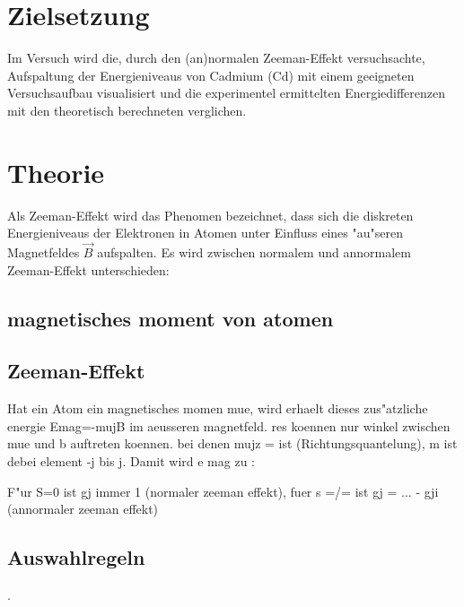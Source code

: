 \section{Zielsetzung}
  Im Versuch wird die, durch den (an)normalen Zeeman-Effekt versuchsachte, Aufspaltung der Energieniveaus von Cadmium (Cd) mit einem geeigneten Versuchsaufbau visualisiert und die experimentel ermittelten Energiedifferenzen mit den theoretisch berechneten verglichen.


\section{Theorie}
\label{sec:Theorie}
  Als Zeeman-Effekt wird das Phenomen bezeichnet, dass sich die diskreten Energieniveaus der Elektronen in Atomen unter Einfluss eines "au"seren Magnetfeldes $\vec{B}$ aufspalten.
  Es wird zwischen normalem und annormalem Zeeman-Effekt unterschieden:
  \subsection{magnetisches moment von atomen}


  \subsection{Zeeman-Effekt}
    Hat ein Atom ein magnetisches momen mue, wird erhaelt dieses zus"atzliche energie Emag=-mujB im aeusseren magnetfeld.
    res koennen nur winkel zwischen mue und b auftreten koennen. bei denen mujz =  ist (Richtungsquantelung), m ist debei element -j bis j.
    Damit wird e mag zu :

    F"ur S=0 ist gj immer 1 (normaler zeeman effekt), fuer s =/= ist gj = ... - gji (annormaler zeeman effekt)

  \subsection{Auswahlregeln}  
    .
